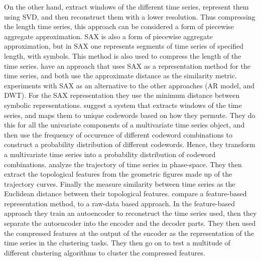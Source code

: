 On the other hand, \textcite{svd_birch_tsc_stock_price} extract windows of the different time series, represent them using SVD, and then reconstruct them with a lower resolution.
Thus compressing the length time series, this approach can be considered a form of piecewise aggregate approximation. 
SAX is also a form of piecewise aggregate approximation, but in SAX one represents segments of time series of specified length, with symbols.
This method is also used to compress the length of the time series. 
\textcite{clust_large_datasets_aghabozorg, apxdist_sax_k_modes} have an approach that uses SAX as a representation method for the time series, and both use the approximate distance as the similarity metric.
\textcite{shape_feat_mod_tsc_rfa} experiments with SAX as an alternative to the other approaches (AR model, and DWT). For the SAX representation they use the minimum distance between symbolic representations.
\textcite{dependency_tsc_energy_markets} suggest a system that extracts windows of the time series, and maps them to unique codewords based on how they permute.
They do this for all the univariate components of a multivariate time series object, 
and then use the frequency of occurence of different codeword combinations to construct a probability distribution of different codewords. 
Hence, they transform a multivariate time series into a probability distribution of codeword combinations. 
\textcite{topology_for_shape_based_tsc} analyze the trajectory of time series in phase-space. 
They then extract the topological features from the geometric figures made up of the trajectory curves. 
Finally the measure similarity between time series as the Euclidean distance between their topological features.
\textcite{auto_encoder_many_tsc_algorithms} compare a feature-based representation method, to a raw-data based approach. 
In the feature-based approach they train an autoencoder to reconstruct the time series used, then they separate the autoencoder into the encoder and the decoder parts. 
They then used the compressed features at the output of the encoder as the representation of the time series in the clustering tasks. 
They then go on to test a multitude of different clustering algorithms to cluster the compressed features. \bigskip

